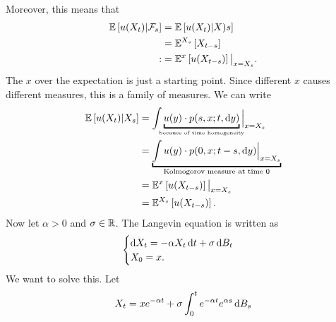Moreover, this means that
\begin{align*}
	\mathbb{E}\left[{u(X_t)|\mathcal{F}_s}\right]&=\mathbb{E}\left[{u(X_t)|X)s}\right]\\
	&=\mathbb{E}^{X_s}\left[X_{t-s}\right]\\
	:&=\mathbb{E}^{x}\left[u(X_{t-s})\right]\big|_{x=X_{s}}.
\end{align*}
The $x$ over the expectation is just a starting point. Since different $x$ causes different measures, this is a family of measures. We can write
\begin{align*}
	\ev{u(X_{t})|X_s}&=\int \underbracket{u(y)\cdot p(s,x;t,\dif y)}_{\mathclap{\text{\tiny because of time homogeneity}}}\Big|_{x=X_s}\\
	&=\underbracket{\int u(y)\cdot p(0,x;t-s,\dif y)\Big|_{x=X_s}}_{\mathclap{\text{Kolmogorov measure at time }0}}\\
	&=\mE^{x}\left[u(X_{t-s})\right]\big|_{x=X_s}\\
	&=\mE^{X_{s}}\left[u(X_{t-s})\right].
\end{align*}
Now let $\alpha>0$ and $\sigma\in\mathbb{R}$. The Langevin equation is written as
\begin{equation*}
	\begin{cases}
		\mathop{}\!\mathrm{d} X_{t}=-\alpha X_t\mathop{}\!\mathrm{d} t+\sigma \mathop{}\!\mathrm{d} B_{t}\\
		X_0=x.
	\end{cases}
\end{equation*}
We want to solve this. Let
\begin{equation*}
	X_t=xe^{-\alpha t}+\sigma\int_0^te^{-\alpha t}e^{\alpha s}\mathop{}\!\mathrm{d} B_{s}
\end{equation*}

